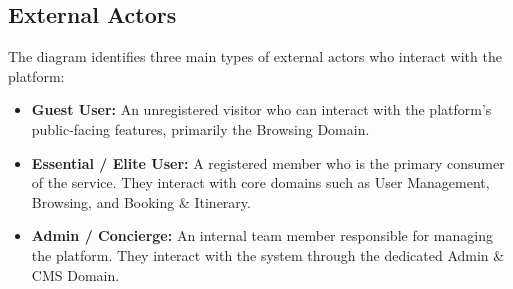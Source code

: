\subsection{External Actors}
The diagram identifies three main types of external actors who interact with the platform:
\begin{itemize}
    \item \textbf{Guest User:} An unregistered visitor who can interact with the platform's public-facing features, primarily the Browsing Domain.
    \item \textbf{Essential / Elite User:} A registered member who is the primary consumer of the service. They interact with core domains such as User Management, Browsing, and Booking \& Itinerary.
    \item \textbf{Admin / Concierge:} An internal team member responsible for managing the platform. They interact with the system through the dedicated Admin \& CMS Domain.
\end{itemize}
